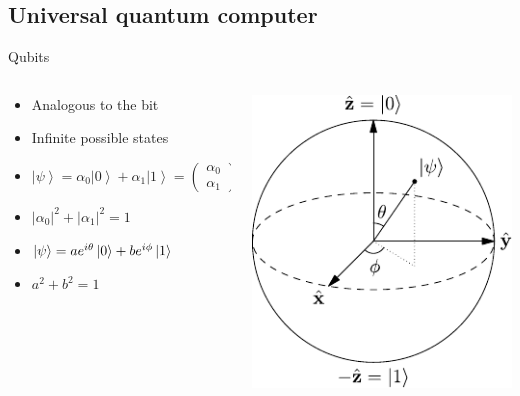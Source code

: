 \documentclass[14pt]{beamer}
\begin{document}
\subsection{Universal quantum computer}
\begin{frame}{Qubits}
\begin{columns}[T]
	\begin{column}{.6\textwidth}
		\begin{block}{}
			\begin{itemize}
				\item Analogous to the bit
				\item Infinite possible states
				\item $ \left | \psi \right \rangle=\alpha _{0}\left | 0 \right \rangle+\alpha _{1}\left | 1 \right \rangle=\begin{pmatrix}\alpha_{0}\\ \alpha_{1}\end{pmatrix}$
				\item $ \left | \alpha_{0} \right |^{2} + \left | \alpha_{1} \right |^{2}=1$
				\item $\ket{\psi} = ae^{i\theta}\ket{0} + be^{i\phi}\ket{1}$
				\item $a^2 + b^2 = 1$
			\end{itemize}
    	\end{block}
	\end{column}
	\begin{column}{.4\textwidth}
    	\begin{block}{}
			\includegraphics[width=1\textwidth]{../resources/pdfs/Bloch_Sphere.pdf}
		\end{block}
	\end{column}
\end{columns}
\end{frame}
\end{document}
